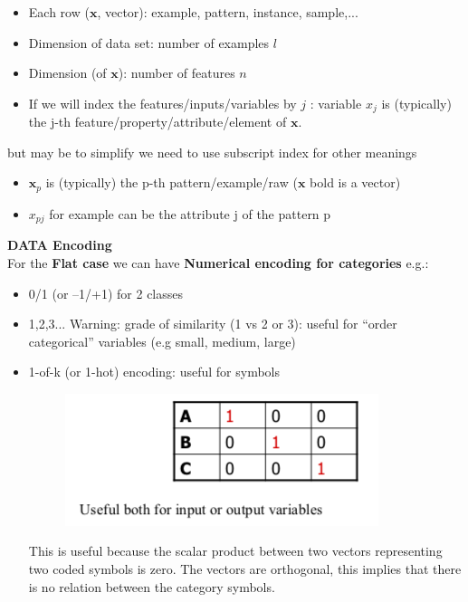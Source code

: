 \documentclass[../main.tex]{subfiles}
\begin{document}
\begin{itemize}
    \item Each row ($\mathbf{x}$, vector): example, pattern, instance, sample,...
    \item Dimension of data set: number of examples $l$
    \item Dimension (of $\mathbf{x}$): number of features $n$
    \item If we will index the features/inputs/variables by $j$ :
variable $x_j$ is (typically) the j-th feature/property/attribute/element of $\mathbf{x}$.
\end{itemize}
but may be to simplify we need to use subscript index for other meanings
\begin{itemize}
    \item $\textbf{x}_p$ is (typically) the p-th pattern/example/raw ($\textbf{x}$ bold is a vector)
    \item $x_{pj}$ for example can be the attribute j of the pattern p
\end{itemize}

\noindent\textbf{DATA Encoding}\\
For the \textbf{Flat case} we can have \textbf{Numerical encoding for categories} e.g.:
\begin{itemize}
    \item 0/1 (or –1/+1) for 2 classes
    \item 1,2,3... Warning: grade of similarity (1 vs 2 or 3): useful for “order
categorical” variables (e.g small, medium, large)
    \item 1-of-k (or 1-hot) encoding: useful for symbols

    \begin{figure}[H]
    \centering
    \includegraphics[scale=0.45]{lectures/1_Introduction/data_encoding.png}
    \end{figure}
    This is useful because the scalar product between two vectors representing two coded symbols is zero. The vectors are orthogonal, this implies that there is no relation between the category symbols.

\end{itemize}
\end{document}
